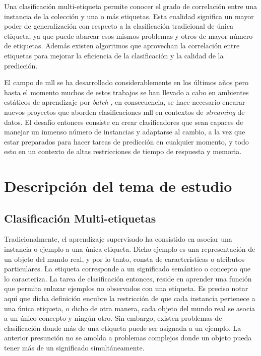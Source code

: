 Una clasificación multi-etiqueta permite conocer el grado de correlación entre
una instancia de la colección y una o más etiquetas. Esta cualidad significa un
mayor poder de generalización con respecto a la clasificación tradicional de
única etiqueta, ya que puede abarcar esos mismos problemas y otros de mayor
número de etiquetas. Además existen algoritmos que aprovechan la correlación
entre etiquetas para mejorar la eficiencia de la clasificación y la calidad de
la predicción.

El campo de \acrshort{mll} se ha desarrollado considerablemente en los últimos
años pero hasta el momento muchos de estos trabajos se han llevado a cabo en
ambientes estáticos de aprendizaje por \textit{batch}
\cite{read_classifier_2011}, en consecuencia, se hace necesario encarar nuevos
proyectos que aborden clasificaciones \acrshort{mll} en contextos de
\textit{streaming} de datos. El desafío entonces consiste en crear
clasificadores que sean capaces de manejar un inmenso número de instancias y
adaptarse al cambio, a la vez que estar preparados para hacer tareas de
predicción en cualquier momento, y todo esto en un contexto de altas
restricciones de tiempo de respuesta y memoria.

\section{Descripción del tema de estudio}

\subsection{Clasificación Multi-etiquetas}
\label{intro_mll}

Tradicionalmente, el aprendizaje supervisado ha consistido en asociar una
instancia o ejemplo a una única etiqueta. Dicho ejemplo es una representación de
un objeto del mundo real, y por lo tanto, consta de características o atributos
particulares. La etiqueta corresponde a un significado semántico o concepto que
lo caracteriza. La tarea de clasificación entonces, reside en aprender una
función que permita enlazar ejemplos no observados con una etiqueta. Es preciso
notar aquí que dicha definición encubre la restricción de que cada instancia
pertenece a una única etiqueta, o dicho de otra manera, cada objeto del mundo
real se asocia a un único concepto y ningún otro. Sin embargo, existen problemas
de clasificación donde más de una etiqueta puede ser asignada a un ejemplo. La
anterior presunción no se amolda a problemas complejos donde un objeto pueda
tener más de un significado simultáneamente. 

